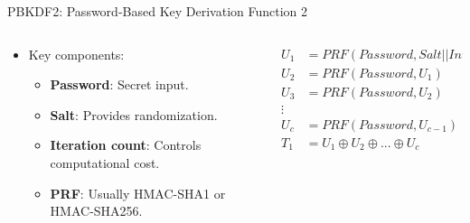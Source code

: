 \documentclass[aspectratio=169, lualatex, handout]{beamer}
\begin{document}
\begin{frame}{PBKDF2: Password-Based Key Derivation Function 2}
	\begin{columns}[c]
		\begin{column}{0.6\textwidth}
			\begin{itemize}
				\item Key components:
				      \begin{itemize}
					      \item \textbf{Password}: Secret input.
					      \item \textbf{Salt}: Provides randomization.
					      \item \textbf{Iteration count}: Controls computational cost.
					      \item \textbf{PRF}: Usually HMAC-SHA1 or HMAC-SHA256.
				      \end{itemize}
			\end{itemize}
		\end{column}
		\begin{column}{0.4\textwidth}
			\begin{tcolorbox}[colback=black!5!white,colframe=ciphergray]
				\small
				\begin{align*}
					U_1 & = PRF(Password, Salt || Int(1))        \\
					U_2 & = PRF(Password, U_1)                   \\
					U_3 & = PRF(Password, U_2)                   \\
					\vdots                                       \\
					U_c & = PRF(Password, U_{c-1})               \\
					T_1 & = U_1 \oplus U_2 \oplus ... \oplus U_c \\
				\end{align*}
			\end{tcolorbox}
		\end{column}
	\end{columns}
\end{frame}
\end{document}
